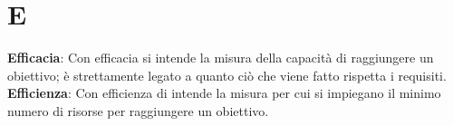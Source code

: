 \section{E}
\textbf{Efficacia}: Con efficacia si intende la misura della capacità di raggiungere un obiettivo; è strettamente
legato a quanto ciò che viene fatto rispetta i requisiti.\\
\textbf{Efficienza}: Con efficienza di intende la misura per cui si impiegano il minimo numero di risorse per
raggiungere un obiettivo.\\
